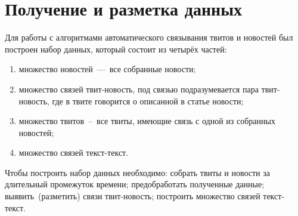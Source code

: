 \section{Получение и разметка данных}
    Для работы с алгоритмами автоматического связывания твитов и новостей был построен набор данных, который состоит из четырёх частей:
    \begin{enumerate}
        \item множество новостей~---~все собранные новости;
        \item множество связей твит-новость, под связью подразумевается пара твит-новость, где в твите говорится о описанной в статье новости;
        \item множество твитов~--~все твиты, имеющие связь с одной из собранных новостей;
        \item множество связей текст-текст.
    \end{enumerate}

    Чтобы построить набор данных необходимо:
    собрать твиты и новости за длительный промежуток времени;
    предобработать полученные данные;
    выявить~(разметить) связи твит-новость;
    построить множество связей текст-текст.

    
    
    
    
    

